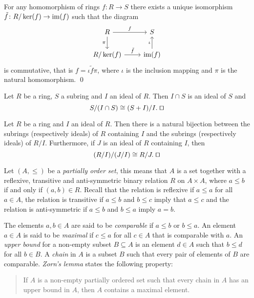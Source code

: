 \begin{theorem}
	For any homomorphism of rings $f\colon R\rightarrow S$ there exists a unique isomorphism 
	$\tilde f\colon R/\ker(f)\rightarrow\operatorname{im}(f)$ such that the diagram
	\[\begin{tikzcd}
		{R} & {S} \\
		{R/\ker(f)} & {\im(f)}
		\arrow["f", from=1-1, to=1-2]
		\arrow["{\pi}"', from=1-1, to=2-1]
		\arrow["{\iota}", from=2-2, to=1-2]
		\arrow["{\tilde f}", from=2-1, to=2-2]
	\end{tikzcd}
	\]
	is commutative, that is $f=\iota \tilde f\pi$, where $\iota$ 
	is the inclusion mapping and $\pi$ is the natural homomorphism. \qed	
\end{theorem} 

\begin{theorem}
	Let $R$ be a ring,  $S$ a subring and $I$ an ideal of $R$. Then $I\cap S$ is an ideal of $S$ and
	$$S/(I\cap S)\cong (S+I)/I. \; \qed$$  
\end{theorem}

\begin{theorem} 
Let $R$ be a ring and $I$ an ideal of $R$. Then there is a natural bijection between the subrings (respectively ideals) of $R$ containing $I$ and the subrings (respectively ideals) of $R/I$. 
Furthermore, if $J$ is an ideal of $R$ containing $I$, then
\[
(R/I)/(J/I)\cong R/J.\; \qed
\]
\end{theorem}

Let $(A,\leq)$ be a {\em partially order set}, this means that $A$ is a set together with a 
reflexive, transitive and anti-symmetric binary relation
$R$ on $A\times A$, where $a\leq b$ if and only if $(a,b)\in R$. 
Recall that the relation is reflexive if $a\leq a$ for all $a\in A$, the relation is transitive if 
$a\leq b$ and $b\leq c$ imply that 
$a\leq c$ and the relation is anti-symmetric if $a\leq b$ and $b\leq a$ imply $a=b$.

The elements $a,b\in A$ are said to be {\em comparable} if $a\leq b$ or $b\leq
a$. An element $a\in A$ is said to be {\em maximal} if 
$c\leq a$ 
for all $c\in A$
that is comparable with $a$. 
An {\em upper bound} for a non-empty subset $B\subseteq A$ is an element $d\in
A$ such that $b\leq d$ for all $b\in B$. A {\em chain} in $A$ is a subset 
$B$ such that every pair of elements of $B$ are comparable. 
{\em Zorn's lemma} states the following property: 
\begin{quote}
	If $A$ is a non-empty partially ordered set such that every chain in 
	$A$ has an upper bound in $A$, then $A$ contains a maximal element. 
\end{quote}

